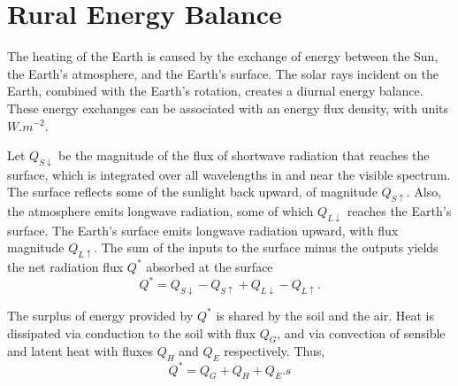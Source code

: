 \section{Rural Energy Balance}
	The heating of the Earth is caused by the exchange of energy between the Sun, the Earth's atmosphere, and the Earth's surface.
	The solar rays incident on the Earth, combined with the Earth's rotation, creates a diurnal energy balance.
	These energy exchanges can be associated with an energy flux density, with units $\si{W.m^{-2}}$.
	
	Let $Q_{S\downarrow}$ be the magnitude of the flux of shortwave radiation that reaches the surface, which is integrated over all wavelengths in and near	the visible spectrum.
	The surface reflects some of the sunlight back upward, of magnitude $Q_{S\uparrow}$.
	Also, the atmosphere emits longwave radiation, some of which
	$Q_{L\downarrow}$ reaches the Earth’s surface.
	The Earth’s surface emits longwave radiation upward, with flux magnitude $Q_{L\uparrow}$. 
	The sum of the inputs to the surface minus the outputs yields the net radiation flux $Q^*$ absorbed at the
	surface
	\begin{equation}
		Q^* = Q_{S\downarrow} - Q_{S\uparrow} + Q_{L\downarrow} - Q_{L\uparrow}.
	\end{equation}
	
	The surplus of energy provided by $Q^*$ is shared by the soil and the air.
	Heat is dissipated via conduction to the soil with flux $Q_G$,
		and via convection of sensible and latent heat with fluxes $Q_H$ and $Q_E$ respectively. 
	Thus,
	\begin{equation}
		Q^* = Q_G + Q_H + Q_E.s
	\end{equation}

